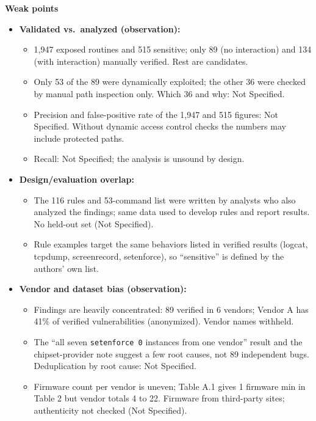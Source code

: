 \documentclass[11pt,a4paper]{article}
\begin{document}
\begin{enumerate}
    \vspace{4pt}
    \textbf{Weak points}
    \begin{itemize}[leftmargin=*, itemsep=1pt, topsep=2pt]
        \item \textbf{Validated vs.\ analyzed (observation):}
        \begin{itemize}[itemsep=0pt]
            \item 1,947 exposed routines and 515 sensitive; only 89 (no interaction) and 134 (with interaction) manually verified. Rest are candidates.
            \item Only 53 of the 89 were dynamically exploited; the other 36 were checked by manual path inspection only. Which 36 and why: Not Specified.
            \item Precision and false-positive rate of the 1,947 and 515 figures: Not Specified. Without dynamic access control checks the numbers may include protected paths.
            \item Recall: Not Specified; the analysis is unsound by design.
        \end{itemize}
        \item \textbf{Design/evaluation overlap:}
        \begin{itemize}[itemsep=0pt]
            \item The 116 rules and 53-command list were written by analysts who also analyzed the findings; same data used to develop rules and report results. No held-out set (Not Specified).
            \item Rule examples target the same behaviors listed in verified results (logcat, tcpdump, screenrecord, setenforce), so ``sensitive'' is defined by the authors' own list.
        \end{itemize}
        \item \textbf{Vendor and dataset bias (observation):}
        \begin{itemize}[itemsep=0pt]
            \item Findings are heavily concentrated: 89 verified in 6 vendors; Vendor A has 41\% of verified vulnerabilities (anonymized). Vendor names withheld.
            \item The ``all seven \texttt{setenforce 0} instances from one vendor'' result and the chipset-provider note suggest a few root causes, not 89 independent bugs. Deduplication by root cause: Not Specified.
            \item Firmware count per vendor is uneven; Table A.1 gives 1 firmware min in Table 2 but vendor totals 4 to 22. Firmware from third-party sites; authenticity not checked (Not Specified).

\end{itemize}
\end{itemize}
\end{enumerate}
\end{document}
